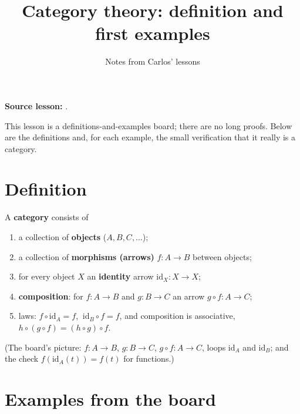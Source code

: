 \documentclass[11pt]{article}
\title{Category theory: definition and first examples}
\author{Notes from Carlos' lessons}
\date{}
\newcommand{\id}{\mathrm{id}}
\begin{document}
\maketitle

\textbf{Source lesson:} .

\medskip
This lesson is a definitions-and-examples board; there are no long proofs. Below are the definitions and, for each example, the small verification that it really is a category.

\section*{Definition}

\begin{definition}
A \textbf{category} consists of
\begin{enumerate}[nosep]
  \item a collection of \textbf{objects} ($A,B,C,\dots$);
  \item a collection of \textbf{morphisms (arrows)} $f:A\to B$ between objects;
  \item for every object $X$ an \textbf{identity} arrow $\id_X:X\to X$;
  \item \textbf{composition}: for $f:A\to B$ and $g:B\to C$ an arrow $g\circ f:A\to C$;
  \item laws: $f\circ\id_A=f$, $\ \id_B\circ f=f$, and composition is associative, $h\circ(g\circ f)=(h\circ g)\circ f$.
\end{enumerate}
\end{definition}

(The board's picture: $f:A\to B$, $g:B\to C$, $g\circ f:A\to C$, loops $\id_A$ and $\id_B$; and the check $f(\id_A(t))=f(t)$ for functions.)

\section*{Examples from the board}
\end{document}
